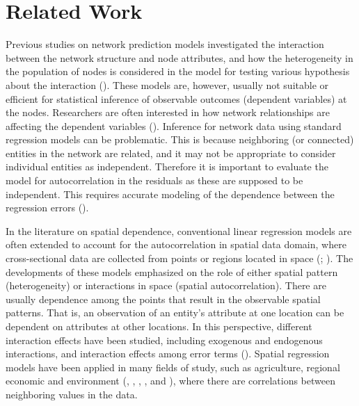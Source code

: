 \documentclass[times, doublespace]{auth}
\begin{document}
\section{Related Work}

Previous studies on network prediction models investigated the interaction between the network structure and node attributes, and how the heterogeneity in the population of nodes is considered in the model for testing various hypothesis about the interaction (\cite{R22}). These models are, however, usually not suitable or efficient for statistical inference of observable outcomes (dependent variables) at the nodes. Researchers are often interested in how network relationships are affecting the dependent variables (\cite{R31}). Inference for network data using standard regression models can be problematic. This is because neighboring (or connected) entities in the network are related, and it may not be appropriate to consider individual entities as independent. Therefore it is important to evaluate the model for autocorrelation in the residuals as these are supposed to be independent. This requires accurate modeling of the dependence between the regression errors (\cite{R24}). 
\newline

In the literature on spatial dependence, conventional linear regression models are often extended to account for the autocorrelation in spatial data domain, where cross-sectional data are collected from points or regions located in space (\cite{R6}; \cite{R21}). The developments of these models emphasized on the role of either spatial pattern (heterogeneity) or interactions in space (spatial autocorrelation). There are usually dependence among the points that result in the observable spatial patterns. That is, an observation of an entity's attribute at one location can be dependent on attributes at other locations. In this perspective, different interaction effects have been studied, including exogenous and endogenous interactions, and interaction effects among error terms (\cite{R32}). Spatial regression models have been applied in many fields of study, such as agriculture, regional economic and environment (\cite{R9}, \cite{R3}, \cite{R4}, \cite{R1}, and \cite{R16}), where there are correlations between neighboring values in the data. 
\newline
\end{document}
